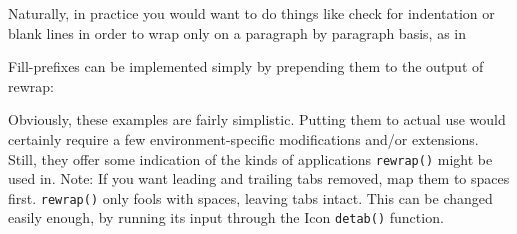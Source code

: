 Naturally, in practice you would want to do things like check for
indentation or blank lines in order to wrap only on a paragraph by
paragraph basis, as in


Fill-prefixes can be implemented simply by prepending them to the output
of rewrap:



Obviously, these examples are fairly simplistic. Putting them to actual
use would certainly require a few environment-specific modifications
and/or extensions. Still, they offer some indication of the kinds of
applications \texttt{rewrap()} might be used in. Note: If you want
leading and trailing tabs removed, map them to spaces first.
\texttt{rewrap()} only fools with spaces, leaving tabs intact. This can
be changed easily enough, by running its input through the Icon
\texttt{detab()} function.


